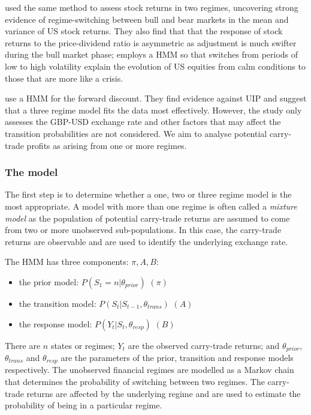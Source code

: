 \documentclass[12pt, a4paper, oneside]{article}\usepackage[]{graphicx}\usepackage[]{color}
\begin{document}
\citet{schaller1997regime} used the same method to assess stock returns in two regimes, uncovering strong evidence of regime-switching between bull and bear markets in the mean and variance of US stock returns.  They also find that that the response of stock returns to the price-dividend ratio is asymmetric as adjustment is much swifter during the bull market phase; \citet{dueker1997markov} employs a HMM so that switches from periods of low to high volatility explain the evolution of US equities from calm conditions to those that are more like a crisis.

\citet{Elliot} use a HMM for the forward discount. They find evidence against UIP and suggest that a three regime model fits the data most effectively.  However, the study only assesses the GBP-USD exchange rate and other factors that may affect the transition probabilities are not considered.  We aim to analyse potential carry-trade profits as arising from one or more regimes.  

\subsubsection{The model}\label{secref:model}
The first step is to determine whether a one, two or three regime model is the most appropriate.  A  model with more than one regime is often called a \emph{mixture model} as the population of potential carry-trade returns are assumed to come from two or more unobserved sub-populations.  
 In this case, the carry-trade returns are observable and are used to identify the underlying exchange rate.  

The HMM has three components: $\pi, A, B$:

\begin{itemize}
\item the prior model: $P(S_1 = n| \theta_{prior})$ $(\pi)$
\item the transition model: $P(S_t| S_{t-1}, \theta_{trans})$ $(A)$
\item the response model: $P(Y_t| S_t, \theta_{resp})$ $(B)$
\end{itemize}

There are $n$ states or regimes; $Y_t$ are the observed carry-trade returns; and $\theta_{prior}$, $\theta_{trans}$ and  $\theta_{resp}$ are the parameters of the prior, transition and response models respectively. The unobserved financial regimes are modelled as a Markov chain that determines the probability of switching between two regimes.  The carry-trade returns are affected by the underlying regime and are used to estimate the probability of being in a particular regime.    
\end{document}
